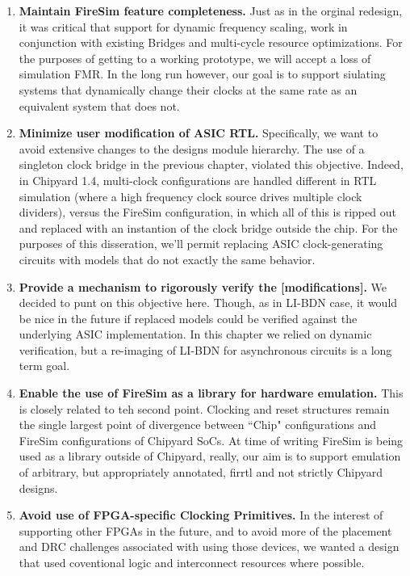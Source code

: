 \begin{enumerate}
\item \textbf{Maintain FireSim feature completeness.} Just as in the orginal
redesign, it was critical that support for dynamic frequency scaling, work in
conjunction with existing Bridges and multi-cycle resource optimizations. For
the purposes of getting to a working prototype, we will accept a loss of
simulation FMR. In the long run however, our goal is to support siulating
systems that dynamically change their clocks at the same rate as an equivalent
system that does not.

\item \textbf{Minimize user modification of ASIC RTL.}
Specifically, we want to avoid extensive changes to the designs module
hierarchy. The use of a singleton clock bridge in the previous chapter,
violated this objective. Indeed, in Chipyard 1.4, multi-clock configurations
are handled different in RTL simulation (where a high frequency clock source
drives multiple clock dividers), versus the FireSim configuration, in which all
of this is ripped out and replaced with an instantion of the clock bridge
outside the chip. For the purposes of this disseration, we'll permit replacing
ASIC clock-generating circuits with models that do not exactly the same behavior.

\item \textbf{Provide a mechanism to rigorously verify the [modifications].} We
decided to punt on this objective here. Though, as in LI-BDN case, it would be
nice in the future if replaced models could be verified against the underlying
ASIC implementation. In this chapter we relied on dynamic verification, but a
re-imaging of LI-BDN for asynchronous circuits is a long term goal.

\item \textbf{Enable the use of FireSim as a library for hardware emulation.}
This is closely related to teh second point. Clocking and reset structures
remain the single largest point of divergence between ``Chip" configurations and
FireSim configurations of Chipyard SoCs. At time of writing FireSim is being
used as a library outside of Chipyard, really, our aim is to support emulation
of arbitrary, but appropriately annotated, firrtl and not strictly Chipyard
designs.

\item \textbf{Avoid use of FPGA-specific Clocking Primitives.}
In the interest of supporting other FPGAs in the future, and to avoid more of
the placement and DRC challenges associated with using those devices, we wanted
a design that used coventional logic and interconnect resources where possible.
\end{enumerate}

